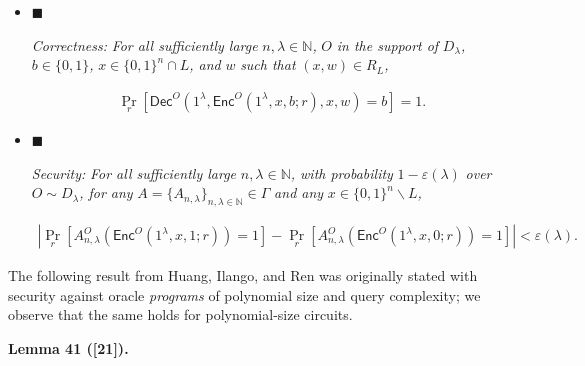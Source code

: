 \begin{itemize}


\item[] 
$\blacksquare$ 


\emph{Correctness:}\emph{ For all sufficiently large }$n,\lambda\in\mathbb{N}$\emph{, }$O$\emph{ in the support of }$D_{\lambda}$\emph{, }$b\in\{0,1\}$\emph{, }$x\in\{0,1\}^{n}\cap L$\emph{, and }$w$\emph{ such that }$(x,w)\in R_{L}$\emph{,}\par


\[\begin{gathered}
\Pr_{r}\left[{\mathsf{Dec}}^{O}(1^{\lambda},{\mathsf{Enc}}^{O}(1^{\lambda},x,b;r),x,w)=b\right]=1.
\end{gathered}\]





\item[] 
$\blacksquare$ 


\emph{Security:}\emph{ For all sufficiently large }$n,\lambda\in\mathbb{N}$\emph{, with probability }$1-\varepsilon(\lambda)$\emph{ over }$O\sim D_{\lambda}$\emph{, for any }$A=\{A_{n,\lambda}\}_{n,\lambda\in\mathbb{N}}\in\Gamma$\emph{ and any }$x\in\{0,1\}^{n}\backslash L$\emph{,}\par


\[\begin{gathered}
\left|\Pr_{r}[A_{n,\lambda}^{O}({\mathsf{Enc}}^{O}(1^{\lambda},x,1;r))=1]-\Pr_{r}[A_{n,\lambda}^{O}({\mathsf{Enc}}^{O}(1^{\lambda},x,0;r))=1]\right|<\varepsilon(\lambda).
\end{gathered}\]





\end{itemize}






The following result from Huang, Ilango, and Ren was originally stated with security against oracle \emph{programs} of polynomial size and query complexity; we observe that the same holds for polynomial-size circuits.\par





\par\medskip\noindent\textbf{
\textbf{Lemma 41}\textbf{ }([21])\textbf{.}
}\par



